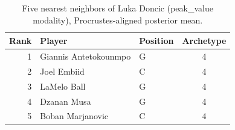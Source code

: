 \begin{table}[htbp]
  \centering\small
  \begin{tabular}{rllc}
    \toprule
    Rank & Player & Position & Archetype \\
    \midrule
    1 & Giannis Antetokounmpo & G & 4 \\
    2 & Joel Embiid & C & 4 \\
    3 & LaMelo Ball & G & 4 \\
    4 & Dzanan Musa & G & 4 \\
    5 & Boban Marjanovic & C & 4 \\
    \bottomrule
  \end{tabular}
  \caption{Five nearest neighbors of Luka Doncic (peak_value modality), Procrustes-aligned posterior mean.}
  \label{tab:Luka_Doncic_neighbors_peak_value}
\end{table}


